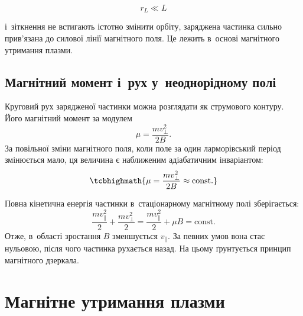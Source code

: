 \begin{equation*}
	r_L\ll L
\end{equation*}

і~зіткнення не встигають істотно змінити орбіту, заряджена частинка сильно прив'язана до силової лінії магнітного поля. Це лежить в~основі магнітного утримання плазми.



\subsection{Магнітний момент і~рух у~неоднорідному полі}



Круговий рух зарядженої частинки можна розглядати як струмового контуру. Його магнітний момент за модулем
\begin{equation}
	\mu=\frac{mv_\perp^2}{2B}.
\end{equation}
За повільної зміни магнітного поля, коли поле за один ларморівський період змінюється мало, ця величина є наближеним адіабатичним інваріантом:
\begin{equation}
	\tcbhighmath{\mu=\frac{mv_\perp^2}{2B}\approx\mathrm{const}.}
\end{equation}

Повна кінетична енергія частинки в~стаціонарному магнітному полі зберігається:
\begin{equation}
	\frac{mv_\parallel^2}{2}+\frac{mv_\perp^2}{2}
	=
	\frac{mv_\parallel^2}{2}+\mu B
	=\mathrm{const}.
\end{equation}
Отже, в~області зростання $B$ зменшується $v_\parallel$. За певних умов вона стає нульовою, після чого частинка рухається назад. На цьому ґрунтується принцип магнітного дзеркала.



\section{Магнітне утримання плазми}




